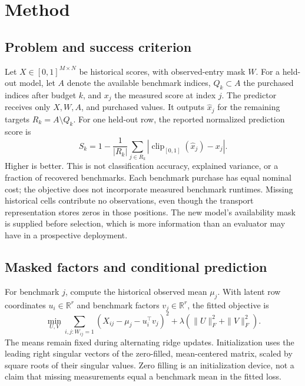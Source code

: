 \documentclass{article}
\begin{document}
\section{Method}
\label{sec:method}
\subsection{Problem and success criterion}
Let $X\in[0,1]^{M\times N}$ be historical scores, with observed-entry mask $W$. For a held-out model, let $A$ denote the available benchmark indices, $Q_k\subset A$ the purchased indices after budget $k$, and $x_j$ the measured score at index $j$. The predictor receives only $X,W,A$, and purchased values. It outputs $\hat x_j$ for the remaining targets $R_k=A\setminus Q_k$. For one held-out row, the reported normalized prediction score is
\begin{equation}
 S_k=1-\frac{1}{|R_k|}\sum_{j\in R_k}
 \left|\operatorname{clip}_{[0,1]}(\hat x_j)-x_j\right|.
 \label{eq:score}
\end{equation}
Higher is better. This is not classification accuracy, explained variance, or a fraction of recovered benchmarks. Each benchmark purchase has equal nominal cost; the objective does not incorporate measured benchmark runtimes. Missing historical cells contribute no observations, even though the transport representation stores zeros in those positions. The new model's availability mask is supplied before selection, which is more information than an evaluator may have in a prospective deployment.

\subsection{Masked factors and conditional prediction}
For benchmark $j$, compute the historical observed mean $\mu_j$. With latent row coordinates $u_i\in\mathbb R^r$ and benchmark factors $v_j\in\mathbb R^r$, the fitted objective is
\begin{equation}
 \min_{U,V}\sum_{i,j:W_{ij}=1}(X_{ij}-\mu_j-u_i^\top v_j)^2
       +\lambda\left(\|U\|_F^2+\|V\|_F^2\right).
 \label{eq:fit}
\end{equation}
The means remain fixed during alternating ridge updates. Initialization uses the leading right singular vectors of the zero-filled, mean-centered matrix, scaled by square roots of their singular values. Zero filling is an initialization device, not a claim that missing measurements equal a benchmark mean in the fitted loss.
\end{document}
